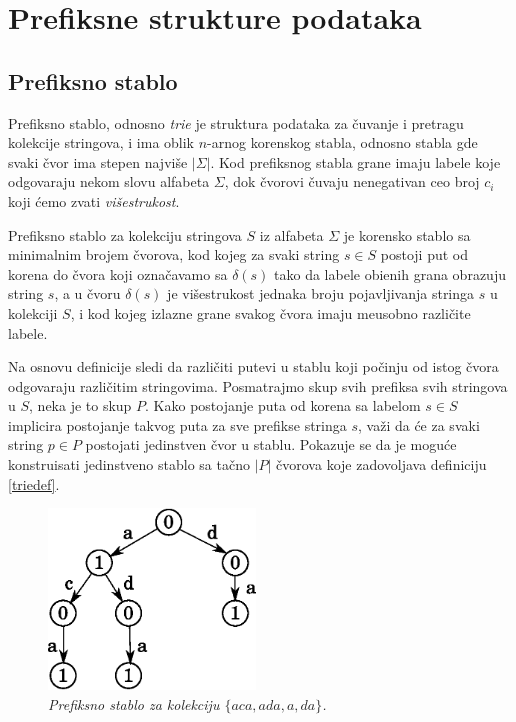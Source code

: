 \section{Prefiksne strukture podataka}

\subsection{Prefiksno stablo}

Prefiksno stablo, odnosno \textit{trie} je struktura podataka za \v cuvanje i pretragu kolekcije stringova, i ima oblik $n$-arnog korenskog stabla, odnosno stabla gde svaki \v cvor ima stepen najvi\v se $|\Sigma|$. Kod prefiksnog stabla grane imaju labele koje odgovaraju nekom slovu alfabeta $\Sigma$, dok \v cvorovi \v cuvaju nenegativan ceo broj $c_i$ koji \' cemo zvati \textit{vi\v sestrukost}.

\begin{dfn}
\label{triedef}
Prefiksno stablo za kolekciju stringova $S$ iz alfabeta $\Sigma$ je korensko stablo sa minimalnim brojem \v cvorova, kod kojeg za svaki string $s \in S$ postoji put od korena do \v cvora koji ozna\v cavamo sa $\delta(s)$ tako da labele obi\dj enih grana obrazuju string $s$, a u \v cvoru $\delta(s)$ je vi\v sestrukost jednaka broju pojavljivanja stringa $s$ u kolekciji $S$, i kod kojeg izlazne grane svakog \v cvora imaju me\dj usobno razli\v cite labele.
\end{dfn}

Na osnovu definicije sledi da razli\v citi putevi u stablu koji po\v cinju od istog \v cvora odgovaraju razli\v citim stringovima. Posmatrajmo skup svih prefiksa svih stringova u $S$, neka je to skup $P$. Kako postojanje puta od korena sa labelom $s \in S$ implicira postojanje takvog puta za sve prefikse stringa $s$, va\v zi da \' ce za svaki string $p \in P$ postojati jedinstven \v cvor u stablu. Pokazuje se da je mogu\' ce konstruisati jedinstveno stablo sa ta\v cno $|P|$ \v cvorova koje zadovoljava definiciju \ref{triedef}.

\begin{figure}[H]
    \centering
    \includegraphics[width=55mm]{../img/trie1.eps}
    \caption*{\textit{Prefiksno stablo za kolekciju $\{aca,ada,a,da\}$.}}
\end{figure}


